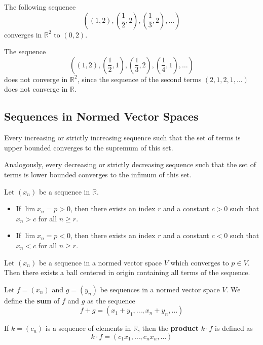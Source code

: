 \begin{example}
	The following sequence
	\[
		\left( (1,2), \left( \frac{1}{2}, 2 \right), \left( \frac{1}{3}, 2 \right), \ldots \right)
	\]
	converges in $\mathbb{R}^2$ to $(0,2)$.
\end{example}

\begin{example}
	The sequence
	\[
		\left( (1,2), \left( \frac{1}{2}, 1 \right), \left( \frac{1}{3}, 2 \right), \left( \frac{1}{4}, 1 \right), \ldots \right)
	\]
	does not converge in $\mathbb{R}^2$, since the sequence of the second terms $(2,1,2,1, \ldots)$ does not converge in $\mathbb{R}$.
\end{example}

\subsection{Sequences in Normed Vector Spaces}

\begin{proposition}
	Every increasing or strictly increasing sequence such that the set of terms is upper bounded converges to the supremum of this set.
\end{proposition}

Analogously, every decreasing or strictly decreasing sequence such that the set of terms is lower bounded converges to the infimum of this set.

\begin{proposition}
	Let $(x_n)$ be a sequence in $\mathbb{R}$.
	\begin{itemize}
		\item If $\lim x_n = p > 0$, then there exists an index $r$ and a constant $c > 0$ such that $x_n > c$ for all $n \geq r$.
		\item If $\lim x_n = p < 0$, then there exists an index $r$ and a constant $c < 0$ such that $x_n < c$ for all $n \geq r$.
	\end{itemize}
\end{proposition}

\begin{proposition}
	Let $(x_n)$ be a sequence in a normed vector space $V$ which converges to $p \in V$. Then there exists a ball centered in origin containing all terms of the sequence.
\end{proposition}

\begin{definition}
	Let $f = (x_n)$ and $g = (y_n)$ be sequences in a normed vector space $V$. We define the \textbf{sum} of $f$ and $g$ as the sequence
	\[
		f + g = (x_1 + y_1, \ldots, x_n + y_n, \ldots)
	\]

	If $k = (c_n)$ is a sequence of elements in $\mathbb{R}$, then the \textbf{product} $k \cdot f$ is defined as 
	\[
		k \cdot f = (c_1 x_1, \ldots, c_n x_n, \ldots)
	\]
\end{definition}

